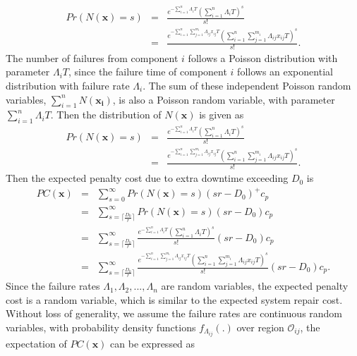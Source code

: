 \documentclass[10pt,a4paper]{article}
\begin{document}
\begin {eqnarray}
Pr(N(\boldsymbol{x})=s) &=&\frac{e^{-\sum_{i=1}^{n}\Lambda_i T}(\sum_{i=1}^{n}\Lambda_i T)^s}{s!} \nonumber \\
&=&\frac{e^{-\sum_{i=1}^{n}\sum_{j=1}^{m_{i}}{\Lambda_{ij}x_{ij}} T}(\sum_{i=1}^{n}\sum_{j=1}^{m_{i}}{\Lambda_{ij}x_{ij}} T)^s}{s!}.
\end {eqnarray}
The number of failures from component $i$ follows a Poisson distribution with parameter $\Lambda_i T$, since the failure time of component $i$ follows an exponential distribution with failure rate $\Lambda_i$. The sum of these independent Poisson random variables, $\sum_{i=1}^{n}N(\boldsymbol{x_i})$, is also a Poisson random variable, with parameter $\sum_{i=1}^{n}\Lambda_i T$. Then the distribution of $N(\boldsymbol{x})$ is given as
\begin {eqnarray}
Pr(N(\boldsymbol{x})=s) &=&\frac{e^{-\sum_{i=1}^{n}\Lambda_i T}(\sum_{i=1}^{n}\Lambda_i T)^s}{s!} \nonumber \\
&=&\frac{e^{-\sum_{i=1}^{n}\sum_{j=1}^{m_{i}}{\Lambda_{ij}x_{ij}} T}(\sum_{i=1}^{n}\sum_{j=1}^{m_{i}}{\Lambda_{ij}x_{ij}} T)^s}{s!}.
\end {eqnarray}
Then the expected penalty cost due to extra downtime exceeding $D_0$ is
\begin {eqnarray}
PC(\boldsymbol{x}) & = & \sum_{s=0}^{\infty}{Pr(N(\boldsymbol{x})=s)(sr-D_{0})^{+}c_{p}} \nonumber \\
& = & \sum_{s=\lceil \frac{D_{0}}{r} \rceil}^{\infty}{Pr(N(\boldsymbol{x})=s)(sr-D_{0})c_{p}} \nonumber \\
& = & \sum_{s=\lceil \frac{D_{0}}{r} \rceil}^{\infty}{\frac{e^{-\sum_{i=1}^{n}\Lambda_i T}(\sum_{i=1}^{n}\Lambda_i T)^s}{s!}(sr-D_{0})c_{p}} \nonumber \\
& = & \sum_{s=\lceil \frac{D_{0}}{r} \rceil}^{\infty}{\frac{e^{-\sum_{i=1}^{n}\sum_{j=1}^{m_{i}}{\Lambda_{ij}x_{ij}} T}(\sum_{i=1}^{n}\sum_{j=1}^{m_{i}}{\Lambda_{ij}x_{ij}} T)^s}{s!}(sr-D_{0})c_{p}}.
\end {eqnarray}
Since the failure rates $\Lambda_1,\Lambda_2,...,\Lambda_n$ are random variables, the expected penalty cost is a random variable, which is similar to the expected system repair cost. Without loss of generality, we assume the failure rates are continuous random variables, with probability density functions $f_{\Lambda_{ij}}(.)$ over region $\mathcal{O}_{ij}$, the expectation of $PC(\boldsymbol{x})$ can be expressed as
\end{document}
